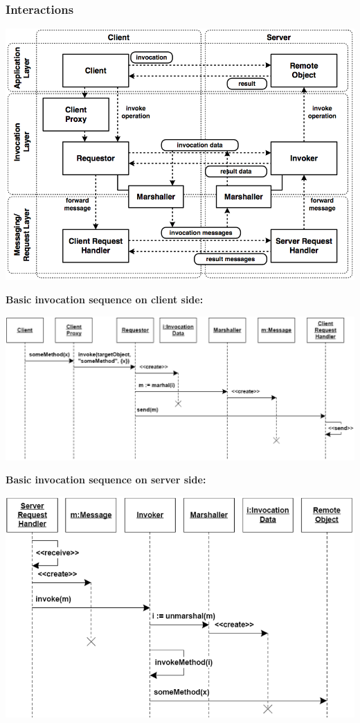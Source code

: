 \documentclass[10pt]{article}
\begin{document}
\subsubsection{Interactions}
\begin{center}
	\includegraphics[scale=0.25]{interactions.png}
\end{center}
\textbf{Basic invocation sequence on client side:}
\begin{center}
	\includegraphics[scale=0.25]{invocation-client.png}
\end{center}
\textbf{Basic invocation sequence on server side:}
\begin{center}
	\includegraphics[scale=0.25]{invocation-server.png}
\end{center}
\end{document}

